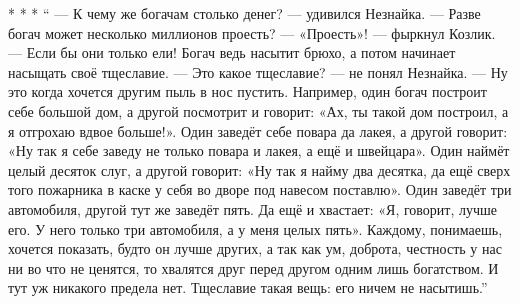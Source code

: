 * * *
\enquote{ --- К чему же богачам столько денег? --- удивился Незнайка. --- Разве богач
может несколько миллионов проесть? --- «Проесть»! --- фыркнул Козлик. --- Если бы
они только ели! Богач ведь насытит брюхо, а потом начинает насыщать своё
тщеславие. --- Это какое тщеславие? --- не понял Незнайка. --- Ну это когда
хочется другим пыль в нос пустить. Например, один богач построит себе
большой дом, а другой посмотрит и говорит: «Ах, ты такой дом построил, а я
отгрохаю вдвое больше!». Один заведёт себе повара да лакея, а другой
говорит: «Ну так я себе заведу не только повара и лакея, а ещё и швейцара».
Один наймёт целый десяток слуг, а другой говорит: «Ну так я найму два
десятка, да ещё сверх того пожарника в каске у себя во дворе под навесом
поставлю». Один заведёт три автомобиля, другой тут же заведёт пять. Да ещё и
хвастает: «Я, говорит, лучше его. У него только три автомобиля, а у меня
целых пять». Каждому, понимаешь, хочется показать, будто он лучше других, а
так как ум, доброта, честность у нас ни во что не ценятся, то хвалятся друг
перед другом одним лишь богатством. И тут уж никакого предела нет. Тщеславие
такая вещь: его ничем не насытишь.}
